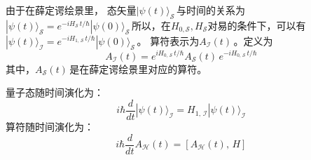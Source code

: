 \documentclass[%
 reprint,
 amsmath,amssymb,
 aps,
]{revtex4-1}
\begin{document}
由于在薛定谔绘景里， 态矢量$|\psi (t)\rangle _{\mathcal {S}}\,\!$与时间的关系为
$ |\psi (t)\rangle _{\mathcal {S}}=e^{-iH_{\mathcal {S}}\,t/\hbar }|\psi (0)\rangle _{\mathcal {S}}\,\!$所以，在$ H_{0,{\mathcal {S}}},H_{\mathcal {S}}$对易的条件下，可以有
$|\psi (t)\rangle _{\mathcal {I}}=e^{-iH_{1,\,{\mathcal {S}}}\,t/\hbar }|\psi (0)\rangle _{\mathcal {S}}\,\!$。
算符表示为$ A_{\mathcal {I}}(t)\,\!$。定义为$$ A_{\mathcal {I}}(t)=e^{iH_{0,\,{\mathcal {S}}}\,t/\hbar }A_{\mathcal {S}}(t)\,e^{-iH_{0,\,{\mathcal {S}}}\,t/\hbar }\,\!$$
其中，$ A_{\mathcal {S}}(t)\,\!$是在薛定谔绘景里对应的算符。

量子态随时间演化为：$$ i\hbar {\frac {d}{dt}}|\psi (t)\rangle _{\mathcal {I}}=H_{1,\,{\mathcal {I}}}|\psi (t)\rangle _{\mathcal {I}}\,\!$$
算符随时间演化为：$$ i\hbar {\frac {d}{dt}}A_{\mathcal {H}}(t)=\left[A_{\mathcal {H}}(t),\,H\right]\,\!$$
\end{document}
